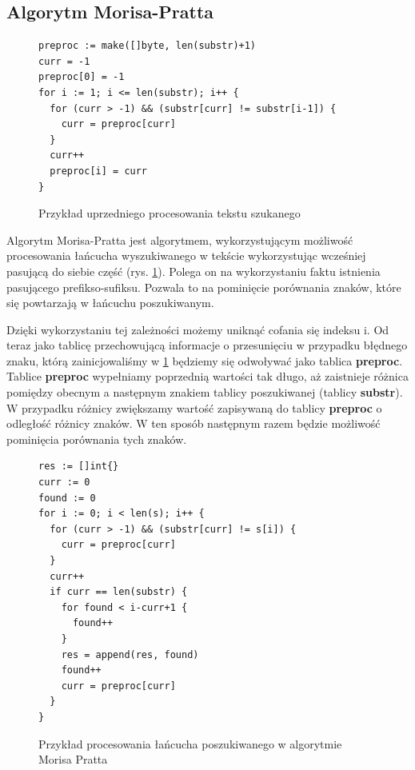 \subsection{Algorytm Morisa-Pratta}

\begin{figure}[h]
  \centering
  \begin{lstlisting}
preproc := make([]byte, len(substr)+1)
curr = -1
preproc[0] = -1
for i := 1; i <= len(substr); i++ {
  for (curr > -1) && (substr[curr] != substr[i-1]) {
    curr = preproc[curr]
  }
  curr++
  preproc[i] = curr
}
  \end{lstlisting}
  \caption{Przykład uprzedniego procesowania tekstu szukanego}
  \label{fig:code:preprocessMorisPratt}
\end{figure}

Algorytm Morisa-Pratta jest algorytmem, wykorzystującym możliwość procesowania 
łańcucha wyszukiwanego w tekście wykorzystując wcześniej pasującą do siebie część
(rys. \ref{fig:code:preprocessMorisPratt}).
Polega on na wykorzystaniu faktu istnienia pasującego prefikso-sufiksu.
Pozwala to na pominięcie porównania znaków, które się powtarzają w łańcuchu poszukiwanym.

Dzięki wykorzystaniu tej zależności możemy uniknąć cofania się indeksu i. 
Od teraz jako tablicę przechowującą informacje o przesunięciu w przypadku 
błędnego znaku, którą zainicjowaliśmy w \ref{fig:code:preprocessMorisPratt}
będziemy się odwoływać jako tablica \textbf{preproc}.
Tablice \textbf{preproc} wypełniamy poprzednią wartości tak długo, aż zaistnieje różnica 
pomiędzy obecnym a następnym znakiem tablicy poszukiwanej (tablicy \textbf{substr}). W przypadku różnicy 
zwiększamy wartość zapisywaną do tablicy \textbf{preproc} o odległość różnicy znaków.
W ten sposób następnym razem będzie możliwość pominięcia porównania tych znaków.

\begin{figure}[h]
  \centering
  \begin{lstlisting}
res := []int{}
curr := 0
found := 0
for i := 0; i < len(s); i++ {
  for (curr > -1) && (substr[curr] != s[i]) {
    curr = preproc[curr]
  }
  curr++
  if curr == len(substr) {
    for found < i-curr+1 {
      found++
    }
    res = append(res, found)
    found++
    curr = preproc[curr]
  }
}
  \end{lstlisting}
  \caption{Przykład procesowania łańcucha poszukiwanego w algorytmie Morisa Pratta}
  \label{fig:code:algoMorisPratt}
\end{figure}

